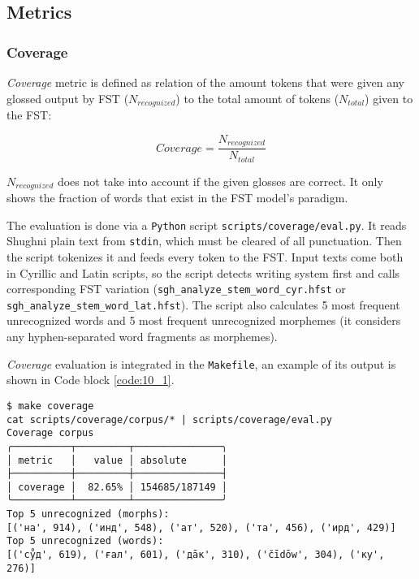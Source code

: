 \subsection{Metrics} \label{metrics_section}
\subsubsection*{Coverage}
\textit{Coverage} metric is defined as relation of the amount tokens that were given any glossed output by FST ($N_{recognized}$) to the total amount of tokens ($N_{total}$) given to the FST:

\[Coverage = \frac{N_{recognized}}{N_{total}}\]

$N_{recognized}$ does not take into account if the given glosses are correct. It only shows the fraction of words that exist in the FST model's paradigm. 

The evaluation is done via a \texttt{Python} script \texttt{scripts/coverage/eval.py}. It reads Shughni plain text from \texttt{stdin}, which must be cleared of all punctuation. Then the script tokenizes it and feeds every token to the FST. Input texts come both in Cyrillic and Latin scripts, so the script detects writing system first and calls corresponding FST variation (\texttt{sgh\_analyze\_stem\_word\_cyr.hfst} or \texttt{sgh\_analyze\_stem\_word\_lat.hfst}). The script also calculates 5 most frequent unrecognized words and 5 most frequent unrecognized morphemes (it considers any hyphen-separated word fragments as morphemes).

\textit{Coverage} evaluation is integrated in the \texttt{Makefile}, an example of its output is shown in Code block \ref{code:10_1}.

\begin{code_frame}[float,floatplacement=!htbp]
    \begin{footnotesize}\codespacing
    \begin{verbatim}
$ make coverage 
cat scripts/coverage/corpus/* | scripts/coverage/eval.py
Coverage corpus
╭──────────┬─────────┬───────────────╮
│ metric   │   value │ absolute      │
├──────────┼─────────┼───────────────┤
│ coverage │  82.65% │ 154685/187149 │
╰──────────┴─────────┴───────────────╯
Top 5 unrecognized (morphs):
[('на', 914), ('инд', 548), ('ат', 520), ('та', 456), ('ирд', 429)]
Top 5 unrecognized (words):
[('су̊д', 619), ('ғал', 601), ('дāк', 310), ('čīdōw', 304), ('ку', 276)]
    \end{verbatim}
    \end{footnotesize}
    \tcblower
    \label{code:10_1}
\end{code_frame}


